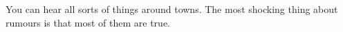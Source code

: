 \startcontents[sq]

\renewcommand{\sqarea}{Town}

\begin{multicols}{2}


You can hear all sorts of things around towns.
The most shocking thing about rumours is that most of them are true.



\end{multicols}


\stopcontents[sq]
